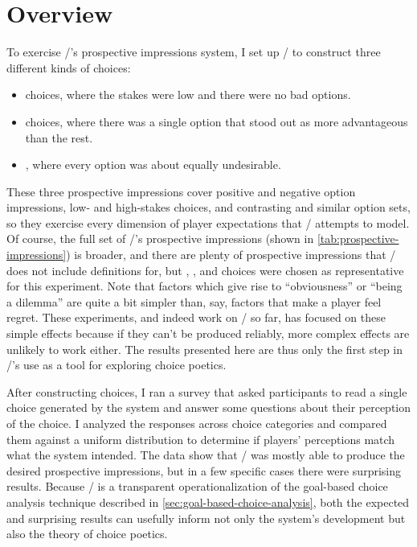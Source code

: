 \section{Overview}

To exercise \dunyazad/'s prospective impressions system, I set up \dunyazad/ to construct three different kinds of choices:
%
\begin{itemize}
  \item {} choices, where the stakes were low and there were no bad options.
  \item {} choices, where there was a single option that stood out as more advantageous than the rest.
  \item {}, where every option was about equally undesirable.
\end{itemize}
%
These three prospective impressions cover positive and negative option impressions, low- and high-stakes choices, and contrasting and similar option sets, so they exercise every dimension of player expectations that \dunyazad/ attempts to model.
%
Of course, the full set of \dunyazad/'s prospective impressions (shown in \cref{tab:prospective-impressions}) is broader, and there are plenty of prospective impressions that \dunyazad/ does not include definitions for, but , , and  choices were chosen as representative for this experiment.
%
Note that factors which give rise to ``obviousness'' or ``being a dilemma'' are quite a bit simpler than, say, factors that make a player feel regret.
%
These experiments, and indeed work on \dunyazad/ so far, has focused on these simple effects because if they can't be produced reliably, more complex effects are unlikely to work either.
%
The results presented here are thus only the first step in \dunyazad/'s use as a tool for exploring choice poetics.


After constructing choices, I ran a survey that asked participants to read a single choice generated by the system and answer some questions about their perception of the choice.
%
I analyzed the responses across choice categories and compared them against a uniform distribution to determine if players' perceptions match what the system intended.
%
The data show that \dunyazad/ was mostly able to produce the desired prospective impressions, but in a few specific cases there were surprising results.
%
Because \dunyazad/ is a transparent operationalization of the goal-based choice analysis technique described in \cref{sec:goal-based-choice-analysis}, both the expected and surprising results can usefully inform not only the system's development but also the theory of choice poetics.


